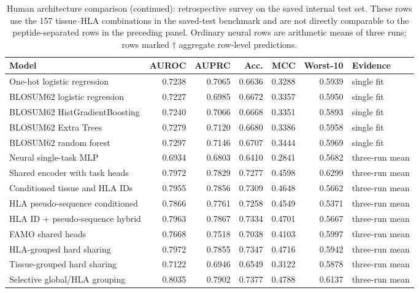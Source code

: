 \begin{table}[t]
\ContinuedFloat
\centering
\caption[]{Human architecture comparison (continued): retrospective survey on the saved internal test set. These rows use the 157 tissue--HLA combinations in the saved-test benchmark and are not directly comparable to the peptide-separated rows in the preceding panel. Ordinary neural rows are arithmetic means of three runs; rows marked $\dagger$ aggregate row-level predictions.}
\fontsize{7.5}{8.5}\selectfont
\renewcommand{\arraystretch}{0.98}
\setlength{\tabcolsep}{2pt}
\begin{tabularx}{\textwidth}{>{\raggedright\arraybackslash}Xrrrrr
                            >{\raggedright\arraybackslash}p{1.7cm}}
\toprule
Model & AUROC & AUPRC & Acc. & MCC & Worst-10 & Evidence \\
\midrule
One-hot logistic regression & 0.7238 & 0.7065 & 0.6636 & 0.3288 & 0.5939 & single fit \\
BLOSUM62 logistic regression & 0.7227 & 0.6985 & 0.6672 & 0.3357 & 0.5950 & single fit \\
BLOSUM62 HistGradientBoosting & 0.7240 & 0.7066 & 0.6668 & 0.3351 & 0.5893 & single fit \\
BLOSUM62 Extra Trees & 0.7279 & 0.7120 & 0.6680 & 0.3386 & 0.5958 & single fit \\
BLOSUM62 random forest & 0.7297 & 0.7146 & 0.6707 & 0.3444 & 0.5969 & single fit \\
Neural single-task MLP & 0.6934 & 0.6803 & 0.6410 & 0.2841 & 0.5682 & three-run mean \\
Shared encoder with task heads & 0.7972 & 0.7829 & 0.7277 & 0.4598 & 0.6299 & three-run mean \\
Conditioned tissue and HLA IDs & 0.7955 & 0.7856 & 0.7309 & 0.4648 & 0.5662 & three-run mean \\
HLA pseudo-sequence conditioned & 0.7866 & 0.7761 & 0.7258 & 0.4549 & 0.5371 & three-run mean \\
HLA ID + pseudo-sequence hybrid & 0.7963 & 0.7867 & 0.7334 & 0.4701 & 0.5667 & three-run mean \\
FAMO shared heads & 0.7668 & 0.7518 & 0.7038 & 0.4103 & 0.5997 & three-run mean \\
HLA-grouped hard sharing & 0.7972 & 0.7855 & 0.7347 & 0.4716 & 0.5942 & three-run mean \\
Tissue-grouped hard sharing & 0.7122 & 0.6946 & 0.6549 & 0.3122 & 0.5878 & three-run mean \\
Selective global/HLA grouping & 0.8035 & 0.7902 & 0.7377 & 0.4788 & 0.6137 & three-run mean \\

\end{tabularx}
\end{table}
